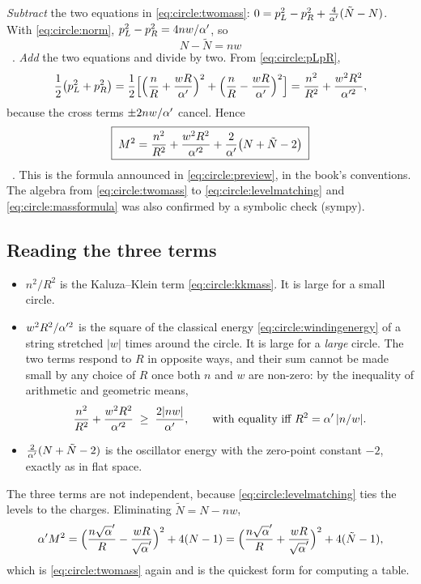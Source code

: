 \emph{Subtract} the two equations in \eqref{eq:circle:twomass}:
$0=p_L^2-p_R^2+\frac4{\alpha'}(\tilde N-N)$. With \eqref{eq:circle:norm},
$p_L^2-p_R^2=4nw/\alpha'$, so
\begin{equation}\label{eq:circle:levelmatching}
 \boxed{\;N-\tilde N=nw\;}
\end{equation}
\TL\ . \emph{Add} the two
equations and divide by two. From \eqref{eq:circle:pLpR},
\[
 \frac12\big(p_L^2+p_R^2\big)
 =\frac12\Big[\Big(\frac nR+\frac{wR}{\alpha'}\Big)^2+\Big(\frac nR-\frac{wR}{\alpha'}\Big)^2\Big]
 =\frac{n^2}{R^2}+\frac{w^2R^2}{\alpha'^2},
\]
because the cross terms $\pm2nw/\alpha'$ cancel. Hence
\begin{equation}\label{eq:circle:massformula}
 \boxed{\;M^2=\frac{n^2}{R^2}+\frac{w^2R^2}{\alpha'^2}+\frac2{\alpha'}\big(N+\tilde N-2\big)\;}
\end{equation}
\TL\ . This is
the formula announced in \eqref{eq:circle:preview}, in the book's conventions. The algebra from
\eqref{eq:circle:twomass} to \eqref{eq:circle:levelmatching} and
\eqref{eq:circle:massformula} was also confirmed by a symbolic check (sympy).

\subsection{Reading the three terms}

\begin{itemize}[leftmargin=*]
\item $n^2/R^2$ is the Kaluza--Klein term \eqref{eq:circle:kkmass}. It is large for a small
circle.
\item $w^2R^2/\alpha'^2$ is the square of the classical energy \eqref{eq:circle:windingenergy} of
a string stretched $|w|$ times around the circle. It is large for a \emph{large} circle. The
two terms respond to $R$ in opposite ways, and their sum cannot be made small by any choice
of $R$ once both $n$ and $w$ are non-zero: by the inequality of arithmetic and geometric
means,
\begin{equation}\label{eq:circle:amgm}
 \frac{n^2}{R^2}+\frac{w^2R^2}{\alpha'^2}\;\ge\;\frac{2|nw|}{\alpha'},
 \qquad\text{with equality iff }R^2=\alpha'\,|n/w| .
\end{equation}
\item $\frac2{\alpha'}(N+\tilde N-2)$ is the oscillator energy with the zero-point constant $-2$,
exactly as in flat space.
\end{itemize}
The three terms are not independent, because \eqref{eq:circle:levelmatching} ties the levels
to the charges. Eliminating $\tilde N=N-nw$,
\begin{equation}\label{eq:circle:massalt}
 \ap M^2=\Big(\frac{n\sqrt\ap}{R}-\frac{wR}{\sqrt\ap}\Big)^2+4(N-1)
        =\Big(\frac{n\sqrt\ap}{R}+\frac{wR}{\sqrt\ap}\Big)^2+4(\tilde N-1),
\end{equation}
which is \eqref{eq:circle:twomass} again and is the quickest form for computing a table.

